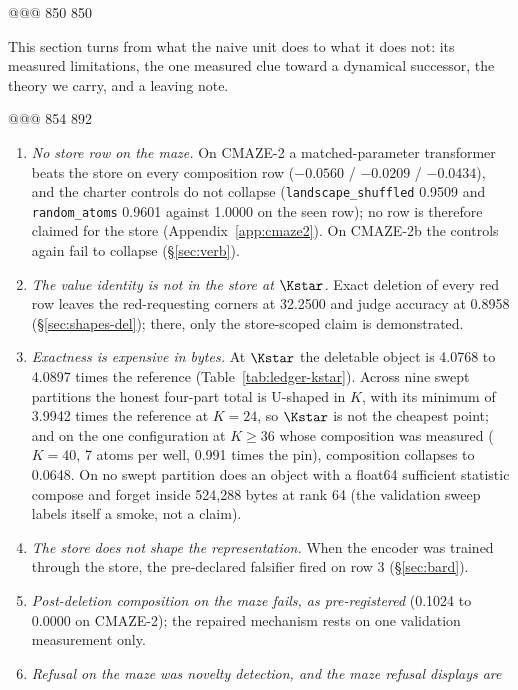 @@@ 850 850

This section turns from what the naive unit does to what it does not: its measured limitations,
the one measured clue toward a dynamical successor, the theory we carry, and a leaving note.

@@@ 854 892
\begin{enumerate}[leftmargin=*,itemsep=1pt]
\item \emph{No store row on the maze.} On CMAZE-2 a matched-parameter transformer beats the
  store on every composition row ($-0.0560$ / $-0.0209$ / $-0.0434$), and the charter controls do
  not collapse (\texttt{landscape\_shuffled} 0.9509 and \texttt{random\_atoms} 0.9601 against
  1.0000 on the seen row); no row is therefore claimed for the store (Appendix~\ref{app:cmaze2}).
  On CMAZE-2b the controls again fail to collapse (\S\ref{sec:verb}). %
\item \emph{The value identity is not in the store at $\Kstar$.} Exact deletion of every red
  row leaves the red-requesting corners at 32.2500 and judge accuracy at 0.8958
  (\S\ref{sec:shapes-del}); there, only the store-scoped claim is demonstrated.
\item \emph{Exactness is expensive in bytes.} At $\Kstar$ the deletable object is 4.0768 to 4.0897
  times the reference (Table~\ref{tab:ledger-kstar}). Across nine swept partitions the honest
  four-part total is U-shaped in $K$, with its minimum of 3.9942 times the reference at $K=24$, so
  $\Kstar$ is not the cheapest point; and on the one configuration at $K\ge36$ whose composition
  was measured ($K=40$, 7 atoms per well, 0.991 times the pin), composition collapses to 0.0648.
  On no swept partition does an object with a float64 sufficient statistic compose and forget inside 524,288 bytes at rank
  64 (the validation sweep labels itself a smoke, not a claim).
\item \emph{The store does not shape the representation.} When the encoder was trained through
  the store, the pre-declared falsifier fired on row 3 (\S\ref{sec:bard}). %
\item \emph{Post-deletion composition on the maze fails, as pre-registered} (0.1024 to 0.0000
  on CMAZE-2); the repaired mechanism rests on one validation measurement only.
\item \emph{Refusal on the maze was novelty detection, and the maze refusal displays are
}
\end{enumerate}
